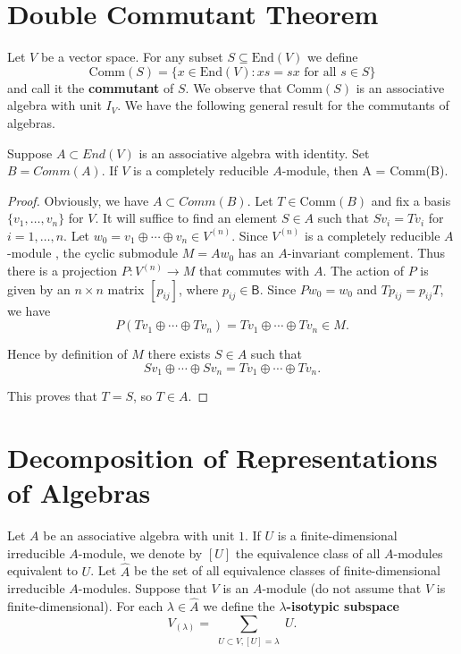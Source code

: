 \documentclass[12pt]{article}
\newenvironment{theorem}[2][Theorem]{\begin{trivlist}
\item[\hskip \labelsep {\bfseries #1}\hskip \labelsep {\bfseries #2.}]}{\end{trivlist}}
\begin{document}
\section{Double Commutant Theorem}
Let $V$ be a vector space. For any subset $S \subseteq \text{End}(V)$ we define
\[ \text{Comm}(S) = \{ x \in \text{End}(V) : xs = sx \text{ for all } s \in S \} \]
and call it the \textbf{commutant} of $S$. We observe that $\text{Comm}(S)$ is an associative algebra with unit $I_V$. We have the following general result for the commutants of algebras.
\begin{theorem}{5.1}
    Suppose $A\subset End(V)$ is an associative algebra with identity. Set $B = Comm(A)$. If $V$ is a completely reducible $A$-module, then A = Comm(B).
\end{theorem}
\begin{proof}
    Obviously, we have $A\subset Comm(B)$.
    Let $T \in \mathrm{Comm}(B)$ and fix a basis $\{v_1, \ldots, v_n\}$ for $V$. It will suffice to find an element $S \in A$ such that $Sv_i = Tv_i$ for $i = 1, \ldots, n$. Let $w_0 = v_1 \oplus \cdots \oplus v_n \in V^{(n)}$. Since $V^{(n)}$ is a completely reducible $A$-module , the cyclic submodule $M = Aw_0$ has an $A$-invariant complement. Thus there is a projection $P: V^{(n)} \to M$ that commutes with $A$. The action of $P$ is given by an $n \times n$ matrix $[p_{ij}]$, where $p_{ij} \in \mathsf{B}$. Since $Pw_0 = w_0$ and $Tp_{ij} = p_{ij}T$, we have
    $$ P(Tv_1 \oplus \cdots \oplus Tv_n) = Tv_1 \oplus \cdots \oplus Tv_n \in M. $$
    
    Hence by definition of $M$ there exists $S \in {A}$ such that
    $$ Sv_1 \oplus \cdots \oplus Sv_n = Tv_1 \oplus \cdots \oplus Tv_n. $$
    
    This proves that $T = S$, so $T \in A$.
\end{proof}
\section{Decomposition of Representations of Algebras}
    Let $A$ be an associative algebra with unit $1$. If $U$ is a finite-dimensional irreducible $A$-module, we denote by $[U]$ the equivalence class of all $A$-modules equivalent to $U$. Let $\widehat{A}$ be the set of all equivalence classes of finite-dimensional irreducible $A$-modules. Suppose that $V$ is an $A$-module (do not assume that $V$ is finite-dimensional). For each $\lambda \in \widehat{A}$ we define the \textbf{$\lambda$-isotypic subspace}
    $$
    V_{(\lambda)} = \sum_{\substack{U \subset V , [U] = \lambda}} U.
    $$
    
\end{document}
